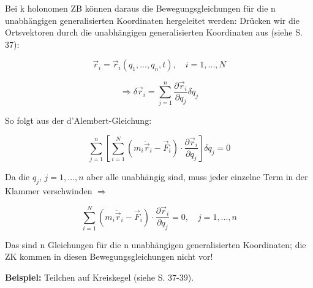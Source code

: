 \documentclass[10pt, letterpaper]{article}
\begin{document}
Bei k holonomen ZB können daraus die Bewegungsgleichungen für die n unabhängigen generalisierten Koordinaten hergeleitet werden:
Drücken wir die Ortsvektoren durch die unabhängigen generalisierten Koordinaten aus (siehe S. 37):

\[\vec{r}_i = \vec{r}_i(q_1,...,q_n,t), \quad i=1,...,N\]

\[\Rightarrow \delta\vec{r}_i = \sum_{j=1}^n \frac{\partial\vec{r}_i}{\partial q_j}\delta q_j\]

So folgt aus der d'Alembert-Gleichung:

\[\sum_{j=1}^n \left[\sum_{i=1}^N (m_i\ddot{\vec{r}}_i-\vec{F}_i)\cdot\frac{\partial\vec{r}_i}{\partial q_j}\right]\delta q_j = 0\]

Da die $q_j$, $j=1,...,n$ aber alle unabhängig sind, muss jeder einzelne Term in der Klammer verschwinden $\Rightarrow$

\[\sum_{i=1}^N (m_i\ddot{\vec{r}}_i-\vec{F}_i)\cdot\frac{\partial\vec{r}_i}{\partial q_j} = 0, \quad j=1,...,n\]

Das sind n Gleichungen für die n unabhängigen generalisierten Koordinaten; die ZK kommen in diesen Bewegungsgleichungen nicht vor!





\textbf{Beispiel:} Teilchen auf Kreiskegel (siehe S. 37-39).



\end{document}
